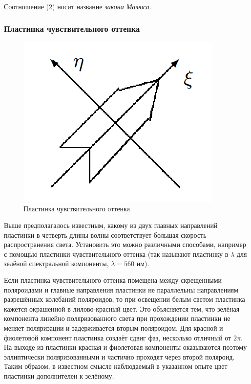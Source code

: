 \documentclass[a4paper,12pt]{article}
\begin{document}
Соотношение (2) носит название \textit{закона Малюса}.

\subsubsection*{Пластинка чувствительного оттенка}

\begin{figure}
	\includegraphics[width=0.8\linewidth]{fig3}
	\caption{Пластинка чувствительного оттенка}
\end{figure}

Выше предполагалось известным, какому из двух главных направлений пластинки в четверть длины волны соответствует большая скорость распространения света.
Установить это можно различными способами, например с помощью
пластинки чувствительного оттенка (так называют пластинку в $ \lambda $
для зелёной спектральной компоненты, $ \lambda = 560 $ нм).

Если пластинка чувствительного оттенка помещена между скрещенными поляроидами и главные направления пластинки не параллельны
направлениям разрешённых колебаний поляроидов, то при освещении
белым светом пластинка кажется окрашенной в лилово-красный цвет.
Это объясняется тем, что зелёная компонента линейно поляризованного света при прохождении пластинки не меняет поляризации и задерживается вторым поляроидом. Для красной и фиолетовой компонент
пластинка создаёт сдвиг фаз, несколько отличный от $ 2\pi $. На выходе
из пластинки красная и фиолетовая компоненты оказываются поэтому
эллиптически поляризованными и частично проходят через второй поляроид. Таким образом, в известном смысле наблюдаемый в указанном
опыте цвет пластинки дополнителен к зелёному.
\end{document}
